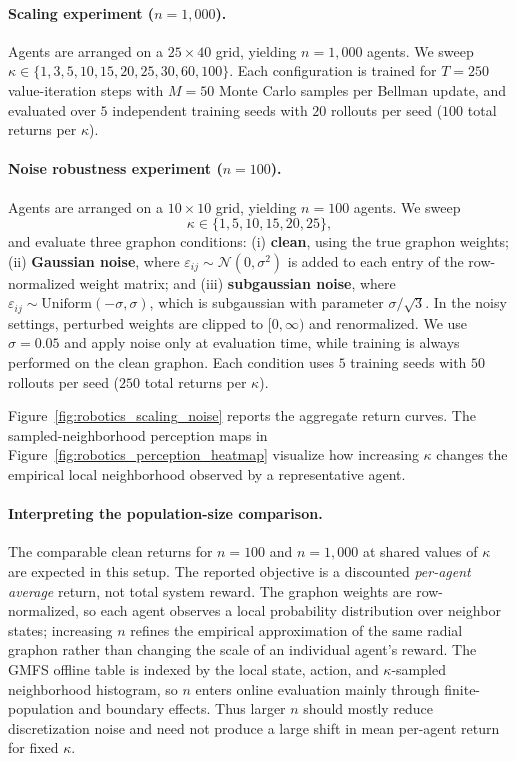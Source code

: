 
\paragraph{Scaling experiment ($n=1{,}000$).}
Agents are arranged on a $25\times 40$ grid, yielding $n=1{,}000$ agents.
We sweep $\kappa \in \{1,3,5,10,15,20,25,30,60,100\}$.
Each configuration is trained for $T=250$ value-iteration steps with $M=50$
Monte Carlo samples per Bellman update, and evaluated over $5$ independent
training seeds with $20$ rollouts per seed ($100$ total returns per $\kappa$).

\paragraph{Noise robustness experiment ($n=100$).}
Agents are arranged on a $10\times 10$ grid, yielding $n=100$ agents. We sweep
\[
\kappa \in \{1,5,10,15,20,25\},
\]
and evaluate three graphon conditions:
(i) \textbf{clean}, using the true graphon weights;
(ii) \textbf{Gaussian noise}, where
$\varepsilon_{ij}\sim\mathcal{N}(0,\sigma^2)$ is added to each entry of the
row-normalized weight matrix; and
(iii) \textbf{subgaussian noise}, where
$\varepsilon_{ij}\sim \mathrm{Uniform}(-\sigma,\sigma)$, which is subgaussian
with parameter $\sigma/\sqrt{3}$.
In the noisy settings, perturbed weights are clipped to $[0,\infty)$ and
renormalized. We use $\sigma=0.05$ and apply noise only at evaluation time,
while training is always performed on the clean graphon. Each condition uses
$5$ training seeds with $50$ rollouts per seed ($250$ total returns per
$\kappa$).

Figure~\ref{fig:robotics_scaling_noise} reports the aggregate return curves.
The sampled-neighborhood perception maps in
Figure~\ref{fig:robotics_perception_heatmap} visualize how increasing
$\kappa$ changes the empirical local neighborhood observed by a representative
agent.

\paragraph{Interpreting the population-size comparison.}
The comparable clean returns for $n=100$ and $n=1{,}000$ at shared values of
$\kappa$ are expected in this setup. The reported objective is a discounted
\emph{per-agent average} return, not total system reward. The graphon weights
are row-normalized, so each agent observes a local probability distribution
over neighbor states; increasing $n$ refines the empirical approximation of the
same radial graphon rather than changing the scale of an individual agent's
reward. The GMFS offline table is indexed by the local state, action, and
$\kappa$-sampled neighborhood histogram, so $n$ enters online evaluation
mainly through finite-population and boundary effects. Thus larger $n$ should
mostly reduce discretization noise and need not produce a large shift in mean
per-agent return for fixed $\kappa$.

